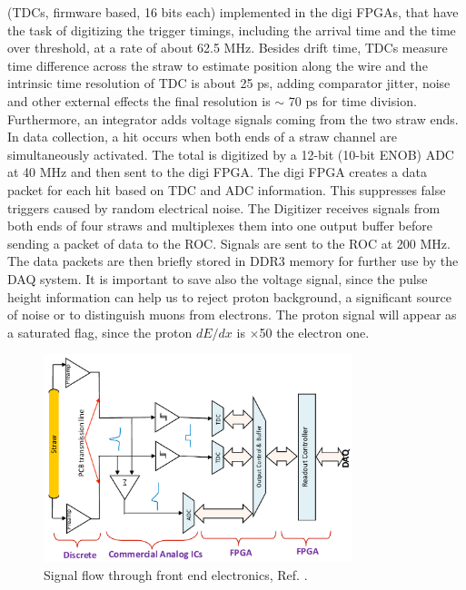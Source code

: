 (TDCs, firmware based, 16 bits each) implemented in the digi FPGAs, that have the task 
of digitizing the trigger timings, including the arrival time and the time over threshold, 
at a rate of about 62.5 MHz. Besides drift time, TDCs measure time difference across the 
straw to estimate position along the wire and the intrinsic time resolution of TDC is about 
25 ps, adding comparator jitter, noise and other external effects the final resolution is 
$\sim$ 70 ps for time division. Furthermore, an integrator adds voltage signals coming 
from the two straw ends. In data collection, a hit occurs when both ends of a straw channel 
are simultaneously activated. The total is digitized by a 12-bit (10-bit ENOB) ADC at 40 MHz
and then sent to the digi FPGA. The digi FPGA creates a data packet for each hit based on 
TDC and ADC information. This suppresses false triggers caused by random electrical noise. 
The Digitizer receives signals from both ends of four straws and multiplexes them into one 
output buffer before sending a packet of data to the ROC. Signals are sent to the ROC at 
200 MHz. The data packets are then briefly stored in DDR3 memory for further use by the 
DAQ system. It is important to save also the voltage signal, since the pulse height 
information can help us to reject proton background, a significant source of noise 
or to distinguish muons from electrons. The proton signal will appear as a saturated flag, 
since the proton $dE/dx$ is $\times$50 the electron one.
\begin{figure}[!h]
\centering
\includegraphics[width =0.8\textwidth]{figures/png/Screenshot_20240203_135048.png}
\caption{Signal flow through front end electronics, Ref. \cite{bartoszek2015mu2e}.}
\label{fig:flowfee}
\end{figure}

